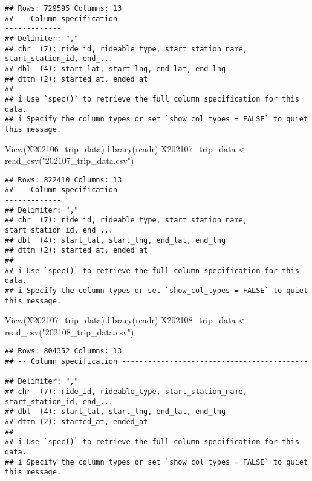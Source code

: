 \documentclass[
]{article}
\newenvironment{Shaded}{\begin{snugshade}}{\end{snugshade}}
\newcommand{\FunctionTok}[1]{\textcolor[rgb]{0.00,0.00,0.00}{#1}}
\newcommand{\NormalTok}[1]{#1}
\newcommand{\OtherTok}[1]{\textcolor[rgb]{0.56,0.35,0.01}{#1}}
\newcommand{\StringTok}[1]{\textcolor[rgb]{0.31,0.60,0.02}{#1}}
\begin{document}
\begin{verbatim}
## Rows: 729595 Columns: 13
## -- Column specification --------------------------------------------------------
## Delimiter: ","
## chr  (7): ride_id, rideable_type, start_station_name, start_station_id, end_...
## dbl  (4): start_lat, start_lng, end_lat, end_lng
## dttm (2): started_at, ended_at
## 
## i Use `spec()` to retrieve the full column specification for this data.
## i Specify the column types or set `show_col_types = FALSE` to quiet this message.
\end{verbatim}

\begin{Shaded}
\begin{Highlighting}[]
\FunctionTok{View}\NormalTok{(X202106\_trip\_data)}
\FunctionTok{library}\NormalTok{(readr)}
\NormalTok{X202107\_trip\_data }\OtherTok{\textless{}{-}} \FunctionTok{read\_csv}\NormalTok{(}\StringTok{"202107\_trip\_data.csv"}\NormalTok{)}
\end{Highlighting}
\end{Shaded}

\begin{verbatim}
## Rows: 822410 Columns: 13
## -- Column specification --------------------------------------------------------
## Delimiter: ","
## chr  (7): ride_id, rideable_type, start_station_name, start_station_id, end_...
## dbl  (4): start_lat, start_lng, end_lat, end_lng
## dttm (2): started_at, ended_at
## 
## i Use `spec()` to retrieve the full column specification for this data.
## i Specify the column types or set `show_col_types = FALSE` to quiet this message.
\end{verbatim}

\begin{Shaded}
\begin{Highlighting}[]
\FunctionTok{View}\NormalTok{(X202107\_trip\_data)}
\FunctionTok{library}\NormalTok{(readr)}
\NormalTok{X202108\_trip\_data }\OtherTok{\textless{}{-}} \FunctionTok{read\_csv}\NormalTok{(}\StringTok{"202108\_trip\_data.csv"}\NormalTok{)}
\end{Highlighting}
\end{Shaded}

\begin{verbatim}
## Rows: 804352 Columns: 13
## -- Column specification --------------------------------------------------------
## Delimiter: ","
## chr  (7): ride_id, rideable_type, start_station_name, start_station_id, end_...
## dbl  (4): start_lat, start_lng, end_lat, end_lng
## dttm (2): started_at, ended_at
## 
## i Use `spec()` to retrieve the full column specification for this data.
## i Specify the column types or set `show_col_types = FALSE` to quiet this message.
\end{verbatim}
\end{document}
